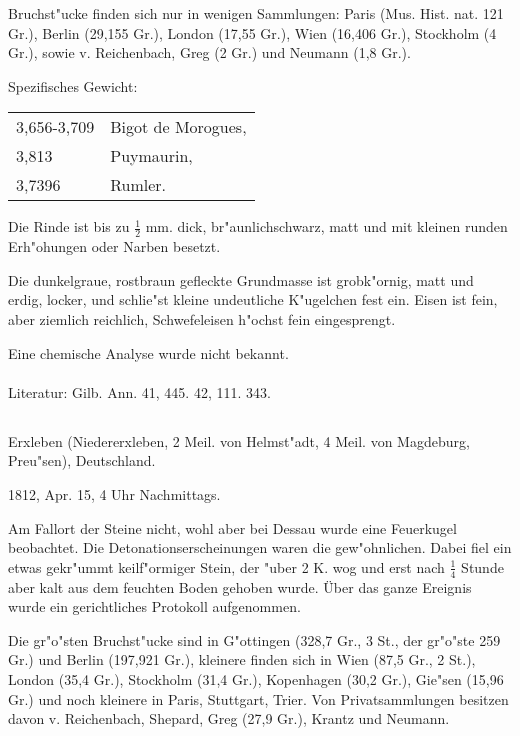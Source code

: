 \documentclass[a4paper, 11pt, oneside]{article}
\begin{document}
Bruchst"ucke finden sich nur in wenigen Sammlungen: Paris (Mus. Hist. nat. 121 Gr.), Berlin (29,155 Gr.), London (17,55 Gr.), Wien (16,406 Gr.), Stockholm (4 Gr.), sowie v. Reichenbach, Greg (2 Gr.) und Neumann (1,8 Gr.).

Spezifisches Gewicht:
\begin{table}[!ht]
    \centering\swabfamily\Large
    \begin{tabular}{l l}
        3,656-3,709 & Bigot de Morogues,\\
        3,813 & Puymaurin,\\
        3,7396 & Rumler.
    \end{tabular}
\end{table}

Die Rinde ist bis zu $\mathfrak{\frac{1}{2}}$ mm. dick, br"aunlichschwarz, matt und mit kleinen runden Erh"ohungen oder Narben besetzt.

Die dunkelgraue, rostbraun gefleckte Grundmasse ist grobk"ornig, matt und erdig, locker, und schlie"st kleine undeutliche K"ugelchen fest ein. Eisen ist fein, aber ziemlich reichlich, Schwefeleisen h"ochst fein eingesprengt.

Eine chemische Analyse wurde nicht bekannt.
\normalsize
\paragraph{}
Literatur: Gilb. Ann. 41, 445. 42, 111. 343.
\subsection{}
\LARGE
\paragraph{}
Erxleben (Niedererxleben, 2 Meil. von Helmst"adt, 4 Meil. von Magdeburg, Preu"sen), Deutschland.

1812, Apr. 15, 4 Uhr Nachmittags.

Am Fallort der Steine nicht, wohl aber bei Dessau wurde eine Feuerkugel beobachtet. Die Detonationserscheinungen waren die gew"ohnlichen. Dabei fiel ein etwas gekr"ummt keilf"ormiger Stein, der "uber 2 K. wog und erst nach $\mathfrak{\frac{1}{4}}$ Stunde aber kalt aus dem feuchten Boden gehoben wurde. Über das ganze Ereignis wurde ein gerichtliches Protokoll aufgenommen.

Die gr"o"sten Bruchst"ucke sind in G"ottingen (328,7 Gr., 3 St., der gr"o"ste 259 Gr.) und Berlin (197,921 Gr.), kleinere finden sich in Wien (87,5 Gr., 2 St.), London (35,4 Gr.), Stockholm (31,4 Gr.), Kopenhagen (30,2 Gr.), Gie"sen (15,96 Gr.) und noch kleinere in Paris, Stuttgart, Trier. Von Privatsammlungen besitzen davon v. Reichenbach, Shepard, Greg (27,9 Gr.), Krantz und Neumann.
\end{document}
